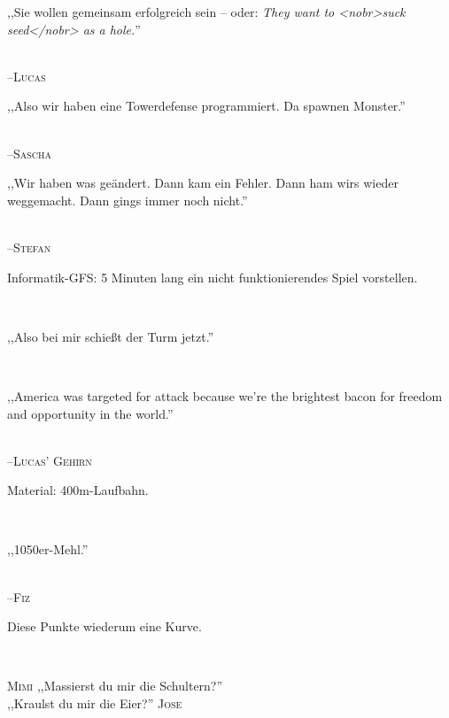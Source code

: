 \vspace{3mm}
{\raggedright ,,Sie wollen gemeinsam erfolgreich sein -- oder: \emph{They want to <nobr>suck seed</nobr> as a hole.}''}\\
\raggedleft \textsc{\footnotesize --\/Lucas}\\

\vspace{3mm}
{\raggedright ,,Also wir haben eine Towerdefense programmiert. Da spawnen Monster.''}\\
\raggedleft \textsc{\footnotesize --\/Sascha}\\

\vspace{3mm}
{\raggedright ,,Wir haben was geändert. Dann kam ein Fehler. Dann ham wirs wieder weggemacht. Dann gings immer noch nicht.''}\\
\raggedleft \textsc{\footnotesize --\/Stefan}\\

\vspace{3mm}
{\raggedright Informatik-GFS: 5 Minuten lang ein nicht funktionierendes Spiel vorstellen.}\\

\vspace{3mm}
{\raggedright ,,Also bei mir schießt der Turm jetzt.''}\\

\vspace{3mm}
{\raggedright ,,America was targeted for attack because we're the brightest bacon for freedom and opportunity in the world.''}\\
\raggedleft \textsc{\footnotesize --\/Lucas' Gehirn}\\

\vspace{3mm}
{\raggedright Material: 400m-Laufbahn.}\\

\vspace{3mm}
{\raggedright ,,1050er-Mehl.''}\\
\raggedleft \textsc{\footnotesize --\/Fiz}\\

\vspace{3mm}
{\raggedright Diese Punkte wiederum eine Kurve.}\\

\vspace{3mm}
\hangindent=0.7cm
\raggedright \textsc{\footnotesize Mimi} ,,Massierst du mir die Schultern?''\\
\raggedleft ,,Kraulst du mir die Eier?'' \textsc{\footnotesize Jose}\\
